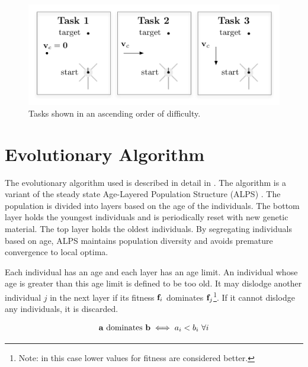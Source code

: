 \begin{figure}
  \centering
  \includegraphics[scale=0.8]{fig/tasks.pdf} 
  \caption[Tasks]{\label{fig:tasks}Tasks shown in an ascending order
    of difficulty.}
\end{figure} 

\section{Evolutionary Algorithm}

The evolutionary algorithm used is described in detail in
\cite{Bongard:2011p3556}.  The algorithm is a variant of the steady
state Age-Layered Population Structure (ALPS)
\cite{Hornby:2009p3558,Hornby:2006p3649}.  The population is divided
into layers based on the age of the individuals.  The bottom layer
holds the youngest individuals and is periodically reset with new
genetic material.  The top layer holds the oldest individuals.  By
segregating individuals based on age, ALPS maintains population
diversity and avoids premature convergence to local
optima\cite{Hornby:2006p3649}.

Each individual has an age and each layer has an age limit.  An
individual whose age is greater than this age limit is defined to be
too old.  It may dislodge another individual $j$ in the next layer if
its fitness $\mathbf{f}_i$ dominates $\mathbf{f}_j$\footnote{Note: in this case
  lower values for fitness are considered better.}.  If it cannot
dislodge any individuals, it is discarded.

\begin{eqnarray}
  \mathbf{a} \text{ dominates } \mathbf{b} \iff a_i < b_i ~ \forall i
\end{eqnarray}

